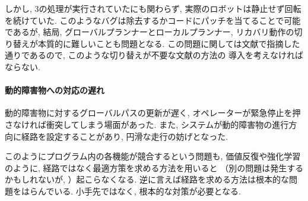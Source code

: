 しかし, 3の処理が実行されていたにも関わらず, 
実際のロボットは静止せず回転を続けていた. 
このようなバグは除去するかコードにパッチを当てることで可能であるが, 
結局, グローバルプランナーとローカルプランナー, 
リカバリ動作の切り替えが本質的に難しいことも問題となる. 
この問題に関しては文献\cite{ueda2023JRM}で指摘した通りであるので, 
このような切り替えが不要な文献\cite{ueda2023JRM}の方法の
導入を考えなければならない. 

\paragraph{動的障害物への対応の遅れ}
動的障害物に対するグローバルパスの更新が遅く, 
オペレーターが緊急停止を押さなければ衝突してしまう場面があった. 
また, システムが動的障害物の進行方向に経路を設定することがあり, 
円滑な走行の妨げとなった. 

このようにプログラム内の各機能が競合するという問題も, 
価値反復や強化学習のように, 
経路ではなく最適方策を求める方法を用いると
（別の問題は発生するかもしれないが, ）起こらなくなる. 
逆に言えば経路を求める方法は根本的な問題をはらんでいる. 
小手先ではなく, 根本的な対策が必要となる. 

